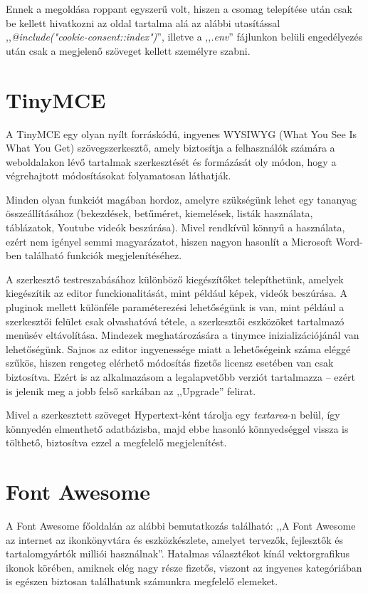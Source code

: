 \documentclass[
]{thesis-ekf}
\theoremstyle{definition}
\theoremstyle{remark}
\begin{document}
            	Ennek a megoldása roppant egyszerű volt, hiszen a csomag telepítése után csak be kellett hivatkozni az oldal tartalma alá az alábbi utasítással ,,\emph{@include("cookie-consent::index")}'', illetve a ,,\emph{.env}'' fájlunkon belüli engedélyezés után csak a megjelenő szöveget kellett személyre szabni.
            	
            \section{TinyMCE}
            	A TinyMCE\cite{TinyMCE} egy olyan nyílt forráskódú, ingyenes WYSIWYG (What You See Is What You Get) szövegszerkesztő, amely biztosítja a felhasználók számára a weboldalakon lévő tartalmak szerkesztését és formázását oly módon, hogy a végrehajtott módosításokat folyamatosan láthatják.
            	
            	Minden olyan funkciót magában hordoz, amelyre szükségünk lehet egy tananyag összeállításához (bekezdések, betűméret, kiemelések, listák használata, táblázatok, Youtube videók beszúrása). Mivel rendkívül könnyű a használata, ezért nem igényel semmi magyarázatot, hiszen nagyon hasonlít a Microsoft Word-ben található funkciók megjelenítéséhez.

                A szerkesztő testreszabásához különböző kiegészítőket telepíthetünk, amelyek kiegészítik az editor funckionalitását, mint például képek, videók beszúrása. A pluginok mellett különféle paraméterezési lehetőségünk is van, mint például a szerkesztői felület csak olvashatóvá tétele, a szerkesztői eszközöket tartalmazó menüsév eltávolítása. Mindezek meghatározására a tinymce inizializációjánál van lehetőségünk. Sajnos az editor ingyenessége miatt a lehetőségeink száma eléggé szűkös, hiszen rengeteg elérhető módosítás fizetős licensz esetében van csak biztosítva. Ezért is az alkalmazásom a legalapvetőbb verziót tartalmazza -- ezért is jelenik meg a jobb felső sarkában az ,,Upgrade'' felirat. 
            	
            	Mivel a szerkesztett szöveget Hypertext-ként tárolja egy \emph{textarea}-n belül, így könnyedén elmenthető adatbázisba, majd ebbe hasonló könnyedséggel vissza is tölthető, biztosítva ezzel a megfelelő megjelenítést. 
            \section{Font Awesome}
                A Font Awesome\cite{FontAwesome} főoldalán az alábbi bemutatkozás található: ,,A Font Awesome az internet az ikonkönyvtára és eszközkészlete, amelyet tervezők, fejlesztők és tartalomgyártók milliói használnak''. Hatalmas választékot kínál vektorgrafikus ikonok körében, amiknek elég nagy része fizetős, viszont az ingyenes kategóriában is egészen biztosan találhatunk számunkra megfelelő elemeket. 
\end{document}
